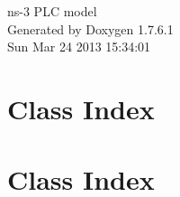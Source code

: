 \documentclass[a4paper]{book}
\begin{document}
\hypersetup{pageanchor=false,citecolor=blue}
\begin{titlepage}
\vspace*{7cm}
\begin{center}
{\Large ns-\/3 \-P\-L\-C model }\\
\vspace*{1cm}
{\large \-Generated by Doxygen 1.7.6.1}\\
\vspace*{0.5cm}
{\small Sun Mar 24 2013 15:34:01}\\
\end{center}
\end{titlepage}
\clearemptydoublepage
{}
\tableofcontents
\clearemptydoublepage
{}
\hypersetup{pageanchor=true,citecolor=blue}
\chapter{\-Class \-Index}

\chapter{\-Class \-Index}

\end{document}
